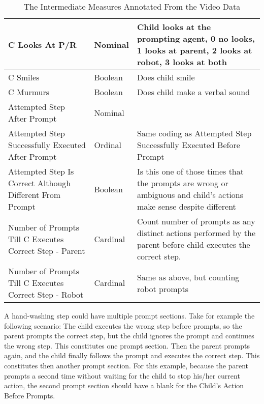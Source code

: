 \begin{table}[h]
\begin{tabular}{ | p{5cm} | l | p{7cm} | }
		C Looks At P/R	&	Nominal	&	Child looks at the prompting agent, 0 no looks, 1 looks at parent, 2 looks at robot, 3 looks at both	\\	\hline
		C Smiles	&	Boolean	&	Does child smile	\\	\hline
		C Murmurs	&	Boolean	&	Does child make a verbal sound	\\	\hline
		
		Attempted Step After Prompt	&	Nominal	&	\\	\hline
		Attempted Step Successfully Executed After Prompt	&	Ordinal	&	Same coding as Attempted Step Successfully Executed Before Prompt	\\	\hline
		Attempted Step Is Correct Although Different From Prompt	&	Boolean	&	Is this one of those times that the prompts are wrong or ambiguous and child's actions make sense despite different	\\	\hline
		Number of Prompts Till C Executes Correct Step - Parent	&	Cardinal	&	Count number of prompts as any distinct actions performed by the parent before child executes the correct step.	\\	\hline
		Number of Prompts Till C Executes Correct Step - Robot	&	Cardinal	&	Same as above, but counting robot prompts	\\	\hline
	
	\end{tabular}
	\caption{The Intermediate Measures Annotated From the Video Data}
	\label{tab:IntermediateMeasures}
\end{table}

A hand-washing step could have multiple prompt sections.  Take for example the following scenario: The child executes the wrong step before prompts, so the parent prompts the correct step, but the child ignores the prompt and continues the wrong step.  This constitutes one prompt section.  Then the parent prompts again, and the child finally follows the prompt and executes the correct step.  This constitutes then another prompt section.  For this example, because the parent prompts a second time without waiting for the child to stop his/her current action, the second prompt section should have a blank for the Child's Action Before Prompts.

